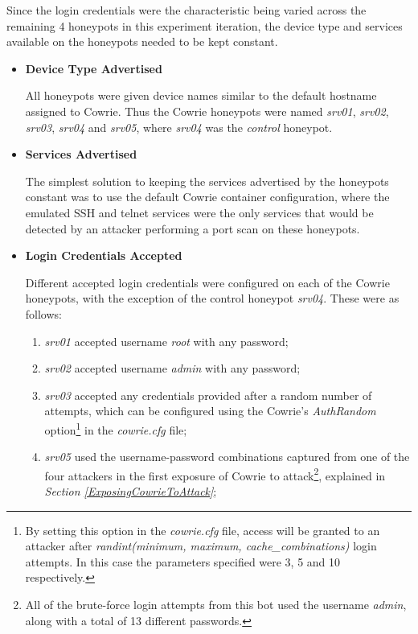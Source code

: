 Since the login credentials were the characteristic being varied across the remaining 4 honeypots in this experiment iteration, the device type and services available on the honeypots needed to be kept constant.

\begin{itemize}
\item \textbf{Device Type Advertised}

All honeypots were given device names similar to the default hostname assigned to Cowrie. Thus the Cowrie honeypots were named \textit{srv01}, \textit{srv02}, \textit{srv03}, \textit{srv04} and \textit{srv05}, where \textit{srv04} was the \textit{control} honeypot.

\item \textbf{Services Advertised}

The simplest solution to keeping the services advertised by the honeypots constant was to use the default Cowrie container configuration, where the emulated SSH and telnet services were the only services that would be detected by an attacker performing a port scan on these honeypots.

\item \textbf{Login Credentials Accepted}

Different accepted login credentials were configured on each of the Cowrie honeypots, with the exception of the control honeypot \textit{srv04}. These were as follows:
    \begin{enumerate}
        \item \textit{srv01} accepted username \textit{root} with any password;
        \item \textit{srv02} accepted username \textit{admin} with any password;
        \item \textit{srv03} accepted any credentials provided after a random number of attempts, which can be configured using the Cowrie's \textit{AuthRandom} option\footnote{By setting this option in the \textit{cowrie.cfg} file, access will be granted to an attacker after \textit{randint(minimum, maximum, cache\_combinations)} login attempts. In this case the parameters specified were 3, 5 and 10 respectively.} in the \textit{cowrie.cfg} file;
 		\item \textit{srv05} used the username-password combinations captured from one of the four attackers in the first exposure of Cowrie to attack\footnote{All of the brute-force login attempts from this bot used the username \textit{admin}, along with a total of 13 different passwords.}, explained in \textit{Section \ref{ExposingCowrieToAttack}};

\end{enumerate}
\end{itemize}

